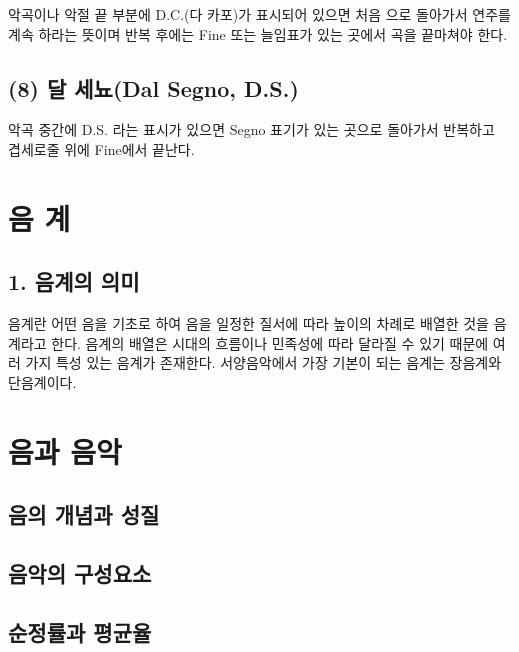 \documentclass[12pt, a4paper, oneside]{book}
\let\stdsection\section
\renewcommand\section{\newpage\stdsection}
\begin{document}
악곡이나 악절 끝 부분에 D.C.(다 카포)가 표시되어 있으면 처음
으로 돌아가서 연주를 계속 하라는 뜻이며 반복 후에는 Fine
또는 늘임표가 있는 곳에서 곡을 끝마쳐야 한다. 

	\subsection{(8) 달 세뇨(Dal Segno, D.S.)}

악곡 중간에 D.S. 라는 표시가 있으면 Segno 표기가 있는 곳으로
돌아가서 반복하고 겹세로줄 위에 Fine에서 끝난다.

%
	\section{음 계}


	\subsection{1. 음계의 의미}

음계란 어떤 음을 기초로 하여 음을 일정한 질서에 따라
높이의 차례로 배열한 것을 음계라고 한다.
음계의 배열은 시대의 흐름이나 민족성에 따라 달라질 수
있기 때문에 여러 가지 특성 있는 음계가 존재한다.
서양음악에서 가장 기본이 되는 음계는 장음계와 단음계이다. 


%
	\section{음과 음악}

	\subsection{음의 개념과 성질}

	\subsection{음악의 구성요소}

	\subsection{순정률과 평균율}
\end{document}
